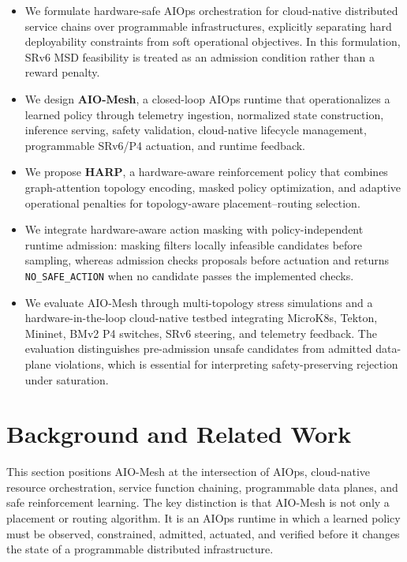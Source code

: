 \documentclass[final,5p]{elsarticle}
\newcommand{\rev}[1]{\textcolor{BrickRed}{#1}}
\begin{document}
\begin{itemize}
    \item We formulate hardware-safe AIOps orchestration for cloud-native distributed service chains over programmable infrastructures, explicitly separating hard deployability constraints from soft operational objectives. In this formulation, SRv6 MSD feasibility is treated as an admission condition rather than a reward penalty.

    \item We design \textbf{AIO-Mesh}, a closed-loop AIOps runtime that operationalizes a learned policy through telemetry ingestion, normalized state construction, inference serving, safety validation, cloud-native lifecycle management, programmable SRv6/P4 actuation, and runtime feedback.

\item We propose \textbf{HARP}, a hardware-aware reinforcement policy that combines graph-attention topology encoding, masked policy optimization, \rev{and adaptive operational penalties for topology-aware placement--routing selection}.

\item We \rev{integrate hardware-aware action masking with policy-independent runtime admission: masking filters locally infeasible candidates before sampling, whereas admission checks proposals before actuation and returns \texttt{NO\_SAFE\_ACTION} when no candidate passes the implemented checks}.

    \item We evaluate AIO-Mesh through multi-topology stress simulations and a hardware-in-the-loop cloud-native testbed integrating MicroK8s, Tekton, Mininet, BMv2 P4 switches, SRv6 steering, and telemetry feedback. The evaluation distinguishes pre-admission unsafe candidates from admitted data-plane violations, which is essential for interpreting safety-preserving rejection under saturation.
\end{itemize}

\section{Background and Related Work}
\label{sec:related}

This section positions AIO-Mesh at the intersection of AIOps, cloud-native resource orchestration, service function chaining, programmable data planes, and safe reinforcement learning. The key distinction is that AIO-Mesh is not only a placement or routing algorithm. It is an AIOps runtime in which a learned policy must be observed, constrained, admitted, actuated, and verified before it changes the state of a programmable distributed infrastructure.
\end{document}
